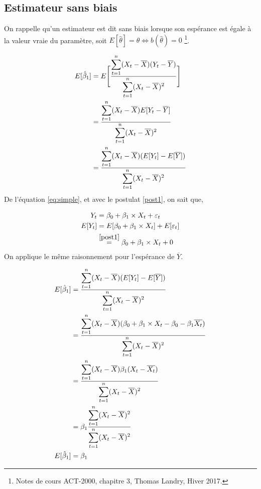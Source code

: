 \documentclass[11pt,french]{report}
\begin{document}
\subsection{Estimateur sans biais}
On rappelle qu'un estimateur est dit sans biais lorsque son espérance est égale à la valeur vraie du paramètre, soit $E[\hat{\theta}] = \theta \Leftrightarrow b(\hat{\theta}) = 0$ \footnote{Notes de cours ACT-2000, chapitre 3, Thomas Landry, Hiver 2017.}.

\begin{align*}
E[\hat{\beta}_1] &= E \Bigg[ \frac{\displaystyle\displaystyle\sum_{t=1}^n(X_t- \overline{X})(Y_t - \overline{Y})}{\displaystyle\displaystyle\sum_{t=1}^n(X_t - \overline{X})^2} \Bigg] \\
&= \frac{\displaystyle\displaystyle\sum_{t=1}^n(X_t- \overline{X})E[Y_t - \overline{Y}]}{\displaystyle\displaystyle\sum_{t=1}^n(X_t - \overline{X})^2} \\
&= \frac{\displaystyle\displaystyle\sum_{t=1}^n(X_t- \overline{X})(E[Y_t] - E[\overline{Y}])}{\displaystyle\displaystyle\sum_{t=1}^n(X_t - \overline{X})^2} \\
\end{align*}
De l'équation \ref{eq:simple}, et avec le postulat \ref{post1}, on sait que,

\begin{align*}
Y_t &= \beta_0 + \beta_1\times X_t + \varepsilon_t \\
E[Y_t] &= E[\beta_0 + \beta_1\times X_t] + E[\varepsilon_t] \\
&\overset{\ref{post1}}{=} \beta_0 + \beta_1\times X_t + 0 \\
\end{align*}
On applique le même raisonnement pour l'espérance de $\overline{Y}$. 

\begin{align*}
E[\hat{\beta}_1] &= \frac{\displaystyle\displaystyle\sum_{t=1}^n(X_t- \overline{X})(E[Y_t] - E[\overline{Y}])}{\displaystyle\displaystyle\sum_{t=1}^n(X_t - \overline{X})^2} \\
&= \frac{\displaystyle\displaystyle\sum_{t=1}^n(X_t- \overline{X})(\beta_0 + \beta_1\times X_t - \beta_0 - \beta_1\overline{X_t})}{\displaystyle\displaystyle\sum_{t=1}^n(X_t - \overline{X})^2} \\
&= \frac{\displaystyle\displaystyle\sum_{t=1}^n(X_t- \overline{X})\beta_1 (X_t - \overline{X_t})}{\displaystyle\displaystyle\sum_{t=1}^n(X_t - \overline{X})^2} \\
&= \beta_1 \frac{\displaystyle\displaystyle\sum_{t=1}^n(X_t- \overline{X})^2}{\displaystyle\displaystyle\sum_{t=1}^n(X_t - \overline{X})^2} \\
E[\hat{\beta}_1] &= \beta_1
\end{align*}
\bigskip
\end{document}
